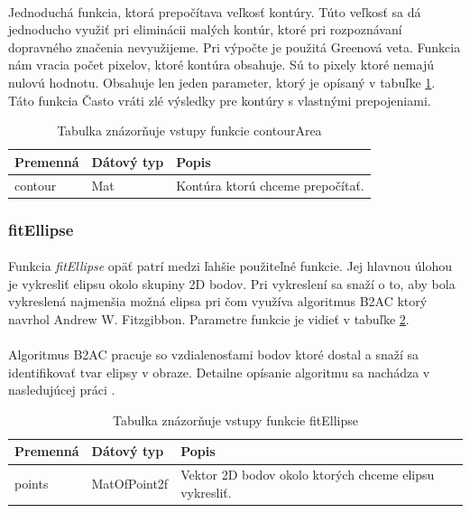 \documentclass[12pt]{article}
\begin{document}
\paragraph{}
Jednoduchá funkcia, ktorá prepočítava veľkosť kontúry.
Túto veľkosť sa dá jednoducho využiť pri eliminácii malých kontúr, ktoré pri rozpoznávaní dopravného značenia nevyužijeme.
Pri výpočte je použitá Greenová veta. Funkcia nám vracia počet pixelov, ktoré kontúra obsahuje. Sú to pixely ktoré nemajú nulovú hodnotu.
Obsahuje len jeden parameter, ktorý je opísaný v tabuľke \ref{contourAreaPar}. Táto funkcia Často vráti zlé výsledky pre kontúry s vlastnými prepojeniami.
\cite{OpenCVDoc}
\begin{table}
	\centering
    \begin{tabular}{ | l | l | p{5cm} |}
    \hline
    Premenná & Dátový typ & Popis \\ \hline
    contour & Mat & Kontúra ktorú chceme prepočítať. \\ 
    \hline
    \end{tabular}
  	\caption{Tabulka znázorňuje vstupy funkcie contourArea}
  	\label{contourAreaPar}
\end{table}
\subsubsection{fitEllipse}
\paragraph{}
Funkcia \emph{fitEllipse} opäť patrí medzi ľahšie použiteľné funkcie. Jej hlavnou úlohou je vykresliť elipsu okolo skupiny 2D bodov.
Pri vykreslení sa snaží o to, aby bola vykreslená najmenšia možná elipsa pri čom využíva algoritmus B2AC ktorý navrhol Andrew W. Fitzgibbon.
Parametre funkcie je vidieť v tabuľke \ref{fitEllipsePar}.\cite{OpenCVDoc}
\paragraph{}
Algoritmus B2AC pracuje so vzdialenosťami bodov ktoré dostal a snaží sa identifikovať tvar elipsy v obraze. Detailne opísanie algoritmu sa nachádza v nasledujúcej práci \cite{fitzgibbo95}.
\begin{table}
	\centering
    \begin{tabular}{ | l | l | p{5cm} |}
    \hline
    Premenná & Dátový typ & Popis \\ \hline
    points & MatOfPoint2f & Vektor 2D bodov okolo ktorých chceme elipsu vykresliť. \\ 
    \hline
    \end{tabular}
  	\caption{Tabulka znázorňuje vstupy funkcie fitEllipse}
  	\label{fitEllipsePar}
\end{table}
\end{document}
